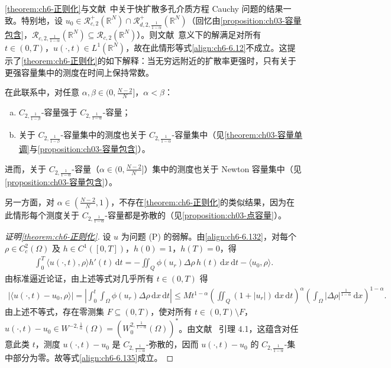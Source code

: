 \documentclass[../../main.tex]{subfiles}%
\begin{document}
\begin{remark}\label{remark:ch06-6.7.2}
\cref{theorem:ch6-正则化}与文献~\cite{ref26,ref80}中关于快扩散多孔介质方程 Cauchy 问题的结果一致。特别地，设 $u_0\in\mathscr{R}^+_{c,2}(\mathbb{R}^N)\cap\mathscr{R}^+_{d,2,\frac{1}{1-\alpha}}(\mathbb{R}^N)$（回忆由\cref{proposition:ch03-容量包含}，$\mathscr{R}_{c,2,\frac{1}{1-\alpha}}(\mathbb{R}^N)\subseteq\mathscr{R}_{c,2}(\mathbb{R}^N)$）。则文献~\cite{ref26,ref80}意义下的解满足对所有 $t\in(0,T)$，$u(\cdot,t)\in L^1(\mathbb{R}^N)$，故在此情形等式\eqref{align:ch6-6.12}不成立。这提示了\cref{theorem:ch6-正则化}的如下解释：当无穷远附近的扩散率更强时，只有关于更强容量集中的测度在时间上保持常数。

在此联系中，对任意 $\alpha,\beta\in(0,\frac{N-2}{N}]$，$\alpha<\beta$：
\begin{enumerate}[(a)]
\item $C_{2,\frac{1}{1-\beta}}$-容量强于 $C_{2,\frac{1}{1-\alpha}}$-容量；
\item 关于 $C_{2,\frac{1}{1-\beta}}$-容量集中的测度也关于 $C_{2,\frac{1}{1-\alpha}}$-容量集中（见\cref{theorem:ch03-容量单调}与\cref{proposition:ch03-容量包含}）。
\end{enumerate}
进而，关于 $C_{2,\frac{1}{1-\alpha}}$-容量（$\alpha\in(0,\frac{N-2}{N}]$）集中的测度也关于 Newton 容量集中（见\cref{proposition:ch03-容量包含}）。
\end{remark}

另一方面，对 $\alpha\in(\frac{N-2}{N},1)$，不存在\cref{theorem:ch6-正则化}的类似结果，因为在此情形每个测度关于 $C_{2,\frac{1}{1-\alpha}}$-容量都是弥散的（见\cref{proposition:ch03-点容量}）。

\begin{proof}[证明\cref{theorem:ch6-正则化}]
设 $u$ 为问题 (P) 的弱解。由\eqref{align:ch6-6.132}，对每个 $\rho\in C^2_c(\Omega)$ 及 $h\in C^1([0,T])$，$h(0)=1$，$h(T)=0$，得
\begin{align*}
\int_0^T\langle u(\cdot,t),\rho\rangle h'(t)\,\mathrm{d}t
=-\iint_Q\phi(u_r)\Delta\rho\,h(t)\,\mathrm{d}x\,\mathrm{d}t-\langle u_0,\rho\rangle.
\end{align*}
由标准逼近论证，由上述等式对几乎所有 $t\in(0,T)$ 得
\begin{align}
|\langle u(\cdot,t)-u_0,\rho\rangle|
=\left|\int_0^t\int_\Omega\phi(u_r)\Delta\rho\,\mathrm{d}x\,\mathrm{d}t\right|
\leqslant Mt^{1-\alpha}\left(\iint_Q(1+|u_r|)\,\mathrm{d}x\,\mathrm{d}t\right)^{\alpha}
\left(\int_\Omega|\Delta\rho|^{\frac{1}{1-\alpha}}\,\mathrm{d}x\right)^{1-\alpha}. \label{align:ch6-6.136}
\end{align}
由上述不等式，存在零测集 $F\subseteq(0,T)$，使对所有 $t\in(0,T)\setminus F$，$u(\cdot,t)-u_0\in W^{-2,\frac{1}{\alpha}}(\Omega)=(W^{2,\frac{1}{1-\alpha}}_0(\Omega))^*$。由文献~\cite{ref10} 引理 4.1，这蕴含对任意此类 $t$，测度 $u(\cdot,t)-u_0$ 是 $C_{2,\frac{1}{1-\alpha}}$-弥散的，因而 $u(\cdot,t)-u_0$ 的 $C_{2,\frac{1}{1-\alpha}}$-集中部分为零。故等式\eqref{align:ch6-6.135}成立。
\end{proof}
\end{document}
